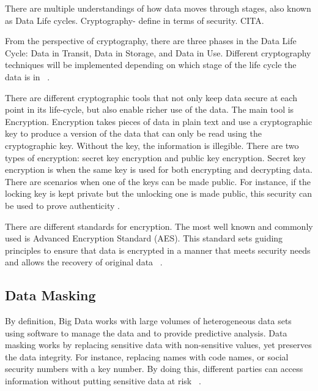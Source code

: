 \documentclass[sigconf]{acmart}
\begin{document}
There are multiple understandings of how data moves through stages, also known as Data Life cycles. Cryptography- define in terms of security. CITA.  

From the perspective of cryptography, there are three phases in the Data Life Cycle: Data in Transit, Data in Storage, and Data in Use.  Different cryptography techniques will be implemented depending on which stage of the life cycle the data is in ~\cite{hamlin2016cryptography}.

There are different cryptographic tools that not only keep data secure at each point in its life-cycle, but also enable richer use of the data. The main tool is Encryption. Encryption takes pieces of data in plain text and use a cryptographic key to produce a version of the data that can only be read using the cryptographic key. Without the key, the information is illegible. There are two types of encryption: secret key encryption and public key encryption. Secret key encryption is when the same key is used for both encrypting and decrypting data. There are scenarios when one of the keys can be made public. For instance, if the locking key is kept private but the unlocking one is made public, this security can be used to prove authenticity \cite{hamlin2016cryptography}.

There are different standards for encryption. The most well known and commonly used is Advanced Encryption Standard (AES). This standard sets guiding principles to ensure that data is encrypted in a manner that meets security needs and allows the recovery of original data ~\cite{hamlin2016cryptography}.

\subsection{Data Masking}
By definition, Big Data works with large volumes of heterogeneous data sets using software to manage the data and to provide predictive analysis. Data masking works by replacing sensitive data with non-sensitive values, yet preserves the data integrity. For instance, replacing names with code names, or social security numbers with a key number. By doing this, different parties can access information without putting sensitive data at risk ~\cite{archana2017big}.
\end{document}
